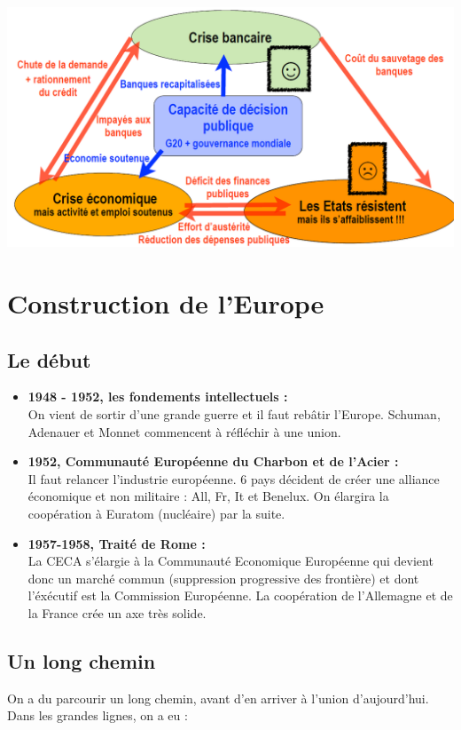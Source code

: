\ \\
\begin{center}
	\includegraphics[scale=0.3]{29}
\end{center}

\section{Construction de l'Europe}
\subsection{Le début}

\begin{itemize}
	\item \textbf{1948 - 1952, les fondements intellectuels :} \\ 
	On vient de sortir d'une grande guerre et il faut rebâtir l'Europe. Schuman, Adenauer et Monnet commencent à réfléchir à une union.
	
	\item \textbf{1952, Communauté Européenne du Charbon et de l'Acier :} \\
	Il faut relancer l'industrie européenne. 6 pays décident de créer une alliance économique et non militaire : All, Fr, It et Benelux. On élargira la coopération à Euratom (nucléaire) par la suite.
	
	\item \textbf{1957-1958, Traité de Rome :} \\
	La CECA s'élargie à la Communauté Economique Européenne qui devient donc un marché commun (suppression progressive des frontière) et dont l'éxécutif est la Commission Européenne. La coopération de l'Allemagne et de la France crée un axe très solide. 
\end{itemize}

\subsection{Un long chemin}
On a du parcourir un long chemin, avant d'en arriver à l'union d'aujourd'hui. Dans les grandes lignes, on a eu :

